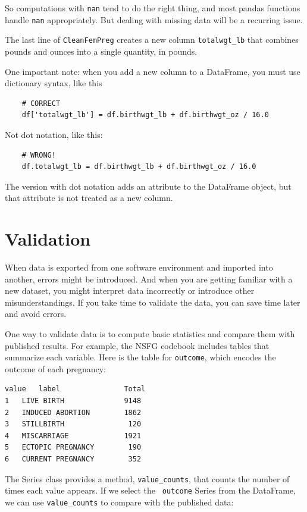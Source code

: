 \documentclass[12pt]{book}
\begin{document}
So computations with {\tt nan} tend to do the right thing, and most
pandas functions handle {\tt nan} appropriately.  But dealing with
missing data will be a recurring issue.

The last line of {\tt CleanFemPreg} creates a new
column \verb"totalwgt_lb" that combines pounds and ounces into
a single quantity, in pounds.

One important note: when you add a new column to a DataFrame, you
must use dictionary syntax, like this

\begin{verbatim}
    # CORRECT
    df['totalwgt_lb'] = df.birthwgt_lb + df.birthwgt_oz / 16.0 
\end{verbatim}

Not dot notation, like this:

\begin{verbatim}
    # WRONG!
    df.totalwgt_lb = df.birthwgt_lb + df.birthwgt_oz / 16.0 
\end{verbatim}

The version with dot notation adds an attribute to the DataFrame
object, but that attribute is not treated as a new column.


\section{Validation}

When data is exported from one software environment and imported into
another, errors might be introduced.  And when you are
getting familiar with a new dataset, you might interpret data
incorrectly or introduce other misunderstandings.  If you take
time to validate the data, you can save time later and avoid errors.

One way to validate data is to compute basic statistics and compare
them with published results.  For example, the NSFG codebook includes
tables that summarize each variable.  Here is the table for
{\tt outcome}, which encodes the outcome of each pregnancy:

\begin{verbatim}
value	label	 	        Total
1	LIVE BIRTH              9148
2	INDUCED ABORTION        1862
3	STILLBIRTH               120
4	MISCARRIAGE             1921
5	ECTOPIC PREGNANCY        190
6	CURRENT PREGNANCY        352
\end{verbatim}

The Series class provides a method, \verb"value_counts", that
counts the number of times each value appears.  If we select the {\tt
  outcome} Series from the DataFrame, we can use \verb"value_counts"
to compare with the published data:
\end{document}
